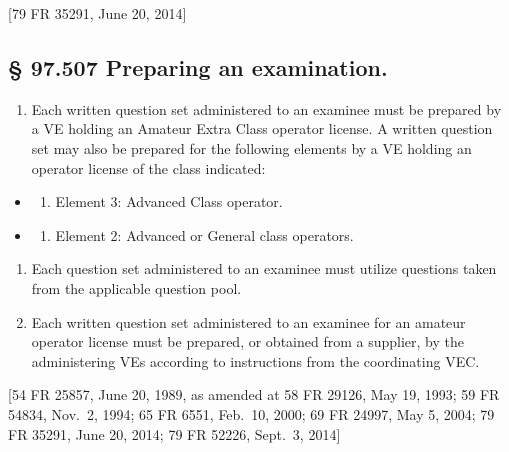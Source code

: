 \documentclass[
  letterpaper,
  DIV=11,
  numbers=noendperiod]{scrreport}
\providecommand{\tightlist}{%
  \setlength{\itemsep}{0pt}\setlength{\parskip}{0pt}}\usepackage{longtable,booktabs,array}
\begin{document}
{[}79 FR 35291, June 20, 2014{]}

\hypertarget{preparing-an-examination.}{%
\subsection*{§ 97.507 Preparing an
examination.}\label{preparing-an-examination.}}

\begin{enumerate}
\def\labelenumi{(\alph{enumi})}
\tightlist
\item
  Each written question set administered to an examinee must be prepared
  by a VE holding an Amateur Extra Class operator license. A written
  question set may also be prepared for the following elements by a VE
  holding an operator license of the class indicated:
\end{enumerate}

\begin{itemize}
\item
  \begin{enumerate}
  \def\labelenumi{(\arabic{enumi})}
  \tightlist
  \item
    Element 3: Advanced Class operator.
  \end{enumerate}
\item
  \begin{enumerate}
  \def\labelenumi{(\arabic{enumi})}
  \setcounter{enumi}{1}
  \tightlist
  \item
    Element 2: Advanced or General class operators.
  \end{enumerate}
\end{itemize}

\begin{enumerate}
\def\labelenumi{(\alph{enumi})}
\setcounter{enumi}{1}
\item
  Each question set administered to an examinee must utilize questions
  taken from the applicable question pool.
\item
  Each written question set administered to an examinee for an amateur
  operator license must be prepared, or obtained from a supplier, by the
  administering VEs according to instructions from the coordinating VEC.
\end{enumerate}

{[}54 FR 25857, June 20, 1989, as amended at 58 FR 29126, May 19, 1993;
59 FR 54834, Nov.~2, 1994; 65 FR 6551, Feb.~10, 2000; 69 FR 24997, May
5, 2004; 79 FR 35291, June 20, 2014; 79 FR 52226, Sept.~3, 2014{]}
\end{document}
